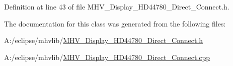 \-Definition at line 43 of file \-M\-H\-V\-\_\-\-Display\-\_\-\-H\-D44780\-\_\-\-Direct\-\_\-\-Connect.\-h.



\-The documentation for this class was generated from the following files\-:\begin{DoxyCompactItemize}
\item 
\-A\-:/eclipse/mhvlib/\hyperlink{_m_h_v___display___h_d44780___direct___connect_8h}{\-M\-H\-V\-\_\-\-Display\-\_\-\-H\-D44780\-\_\-\-Direct\-\_\-\-Connect.\-h}\item 
\-A\-:/eclipse/mhvlib/\hyperlink{_m_h_v___display___h_d44780___direct___connect_8cpp}{\-M\-H\-V\-\_\-\-Display\-\_\-\-H\-D44780\-\_\-\-Direct\-\_\-\-Connect.\-cpp}\end{DoxyCompactItemize}
